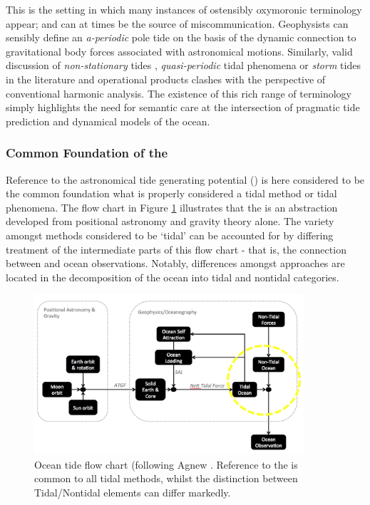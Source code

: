 This is the setting in which many instances of ostensibly oxymoronic terminology appear; and can at times be the source of miscommunication.  Geophysists can sensibly define an \emph{a-periodic} pole tide on the basis of the dynamic connection to gravitational body forces associated with astronomical motions. Similarly,  valid discussion of \emph{non-stationary} tides \cite{Ray:2011tj}, \emph{quasi-periodic} tidal phenomena \citep{Flinchem:2000kp} or \emph{storm} tides \cite{Horsburgh:2008gw} in the literature and operational products clashes with the perspective of conventional harmonic analysis.  The existence of this rich range of terminology simply highlights the need for semantic care at the intersection of pragmatic tide prediction and dynamical models of the ocean.\\


\subsubsection{Common Foundation of the \ATGP{}}
Reference to the astronomical tide generating potential (\ATGP{}) is here considered to be the common foundation what is properly considered a tidal method or tidal phenomena.  The flow chart in Figure \ref{fig:TIDE_FORCE_FLOW} illustrates that the \ATGP{} is an abstraction developed from positional astronomy and gravity theory alone.   The variety amongst methods considered to be `tidal' can be accounted for by differing treatment of the intermediate parts of this flow chart - that is, the connection between \ATGP{} and ocean observations.  Notably, differences amongst approaches are located in the decomposition of the ocean into tidal and nontidal categories.\\

\begin{figure}[h]
\begin{center}
\includegraphics[width=100mm]{figures/tidal_force_flowchart.png}
\caption{Ocean tide flow chart (following Agnew \citep{Agnew:2011ub}.  Reference to the \ATGP{} is common to all tidal methods, whilst the distinction between Tidal/Nontidal elements can differ markedly.}
\label{fig:TIDE_FORCE_FLOW}
\end{center}
\end{figure}


